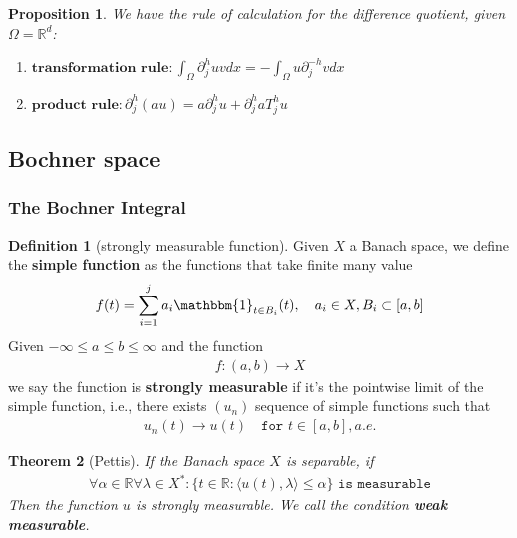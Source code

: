 \documentclass[a4paper,11pt,oneside,fleqn]{book}
\newtheorem{theorem}{Theorem}[section]
\newtheorem{proposition}[theorem]{Proposition}
\theoremstyle{definition}
\newtheorem{definition}{Definition}[section]
\theoremstyle{remark}
\begin{document}
\begin{proposition}
We have the rule of calculation for the difference quotient, given $\Omega = \mathbb{R}^d$:
	
\end{proposition}

\begin{enumerate}
\item
	$\textbf{transformation rule} :
	  \int_\Omega \partial^h_j u v dx = -\int_\Omega u \partial_j^{-h}vdx$ 
\item $\textbf{product rule} :
	 \partial_j^h(au) = a \partial_j^h u  + \partial_j^h a T_j^h u$
\end{enumerate}	



\subsection{Bochner space}
\subsubsection{The Bochner Integral}
\begin{definition}[strongly measurable function]
	Given $X$ a Banach space, we define the \textbf{simple function} as the functions that take finite many value
	\begin{align*}
		f(t) = \sum_{i = 1}^j a_i \mathbbm{1}_{t \in B_i}(t), \quad a_i \in X, B_i \subset [a, b]
	\end{align*}
	Given $-\infty \le a \le b \le \infty$ and the function
	\begin{align*}
		f: (a, b) \rightarrow X
	\end{align*}
	we say the function is \textbf{strongly measurable} if it's the pointwise limit of the simple function, i.e., there exists $(u_n)$ sequence of simple functions such that
	\begin{align*}
		u_n(t) \rightarrow u(t) \quad \texttt{for } t \in [a, b], a.e.
	\end{align*}
\end{definition}

\begin{theorem}[Pettis]
	If the Banach space $X$ is separable, if
		\begin{align*}
		\forall \alpha \in \mathbb{R} \forall \lambda \in X^* : \{t \in \mathbb{R}: \langle u(t), \lambda \rangle \le \alpha \}  \texttt{ is measurable}
	\end{align*}
	Then the function $u$ is strongly measurable. We call the condition \textbf{weak measurable}.
\end{theorem}
\end{document}
